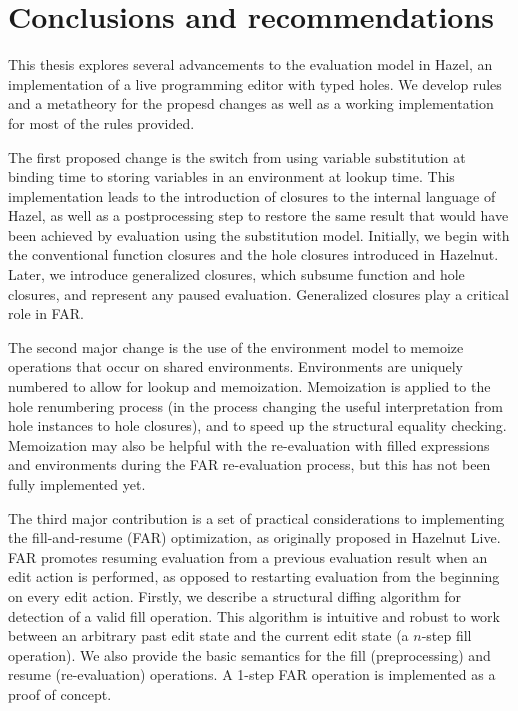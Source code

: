 \chapter{Conclusions and recommendations}
\label{sec:concl}

This thesis explores several advancements to the evaluation model in Hazel, an implementation of a live programming editor with typed holes. We develop rules and a metatheory for the propesd changes as well as a working implementation for most of the rules provided.

The first proposed change is the switch from using variable substitution at binding time to storing variables in an environment at lookup time. This implementation leads to the introduction of closures to the internal language of Hazel, as well as a postprocessing step to restore the same result that would have been achieved by evaluation using the substitution model. Initially, we begin with the conventional function closures and the hole closures introduced in Hazelnut. Later, we introduce generalized closures, which subsume function and hole closures, and represent any paused evaluation. Generalized closures play a critical role in FAR.

The second major change is the use of the environment model to memoize operations that occur on shared environments. Environments are uniquely numbered to allow for lookup and memoization. Memoization is applied to the hole renumbering process (in the process changing the useful interpretation from hole instances to hole closures), and to speed up the structural equality checking. Memoization may also be helpful with the re-evaluation with filled expressions and environments during the FAR re-evaluation process, but this has not been fully implemented yet.

The third major contribution is a set of practical considerations to implementing the fill-and-resume (FAR) optimization, as originally proposed in Hazelnut Live. FAR promotes resuming evaluation from a previous evaluation result when an edit action is performed, as opposed to restarting evaluation from the beginning on every edit action.  Firstly, we describe a structural diffing algorithm for detection of a valid fill operation. This algorithm is intuitive and robust to work between an arbitrary past edit state and the current edit state (a $n$-step fill operation). We also provide the basic semantics for the fill (preprocessing) and resume (re-evaluation) operations. A 1-step FAR operation is implemented as a proof of concept.

